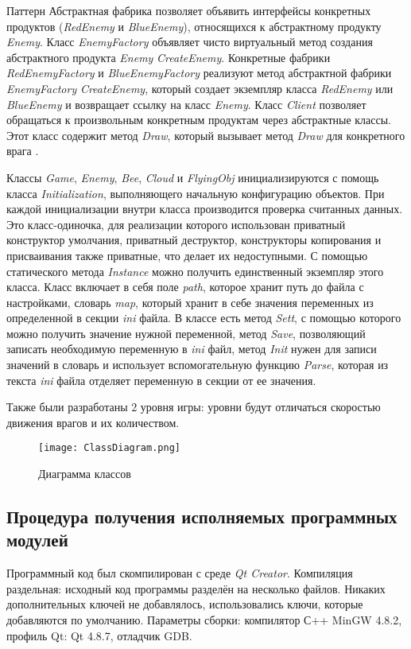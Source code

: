 \documentclass[a4paper,14pt]{article}
\begin{document}
Паттерн Абстрактная фабрика позволяет объявить интерфейсы конкретных продуктов (\textit{RedEnemy} и \textit{BlueEnemy}), относящихся к абстрактному продукту \textit{Enemy}. Класс \textit{EnemyFactory} объявляет чисто виртуальный метод создания абстрактного продукта \textit{Enemy} \textit{CreateEnemy}. Конкретные фабрики \textit{RedEnemyFactory} и \textit{BlueEnemyFactory} реализуют метод абстрактной фабрики \textit{EnemyFactory} \textit{CreateEnemy}, который создает экземпляр класса \textit{RedEnemy} или \textit{BlueEnemy} и возвращает ссылку на класс \textit{Enemy}. Класс \textit{Client} позволяет обращаться к произвольным конкретным продуктам через абстрактные классы. Этот класс содержит метод \textit{Draw}, который вызывает метод \textit{Draw} для конкретного врага .

Классы \textit{Game}, \textit{Enemy}, \textit{Bee}, \textit{Cloud} и \textit{FlyingObj} инициализируются с помощь класса \textit{Initialization}, выполняющего начальную конфигурацию объектов. При каждой инициализации внутри класса производится проверка считанных данных. Это класс-одиночка, для реализации которого использован приватный конструктор умолчания, приватный деструктор, конструкторы копирования и присваивания также приватные, что делает их недоступными. С помощью статического метода \textit{Instance} можно получить единственный экземпляр этого класса. Класс включает в себя поле \textit{path}, которое хранит путь до файла с настройками, словарь \textit{map}, который хранит в себе значения переменных из определенной в секции \textit{ini} файла. В классе есть метод \textit{Sett}, с помощью которого можно получить значение нужной переменной, метод \textit{Save}, позволяющий записать необходимую переменную в \textit{ini} файл, метод \textit{Init} нужен для записи значений в словарь и использует вспомогательную функцию \textit{Parse}, которая из текста \textit{ini} файла отделяет переменную в секции от ее значения.

Также были разработаны 2 уровня игры: уровни будут отличаться скоростью движения врагов и их количеством.

\begin{figure}[H]
	\centering
	\texttt{[image: ClassDiagram.png]}
	\caption{Диаграмма классов}	
\end{figure}

\subsection{Процедура получения исполняемых программных модулей}
Программный код был скомпилирован с среде \textit{Qt Creator}. Компиляция раздельная: исходный код программы разделён на несколько файлов. Никаких дополнительных ключей не добавлялось, использовались ключи, которые добавляются по умолчанию. Параметры сборки: компилятор С++ MinGW 4.8.2, профиль Qt: Qt 4.8.7, отладчик GDB.
\end{document}
